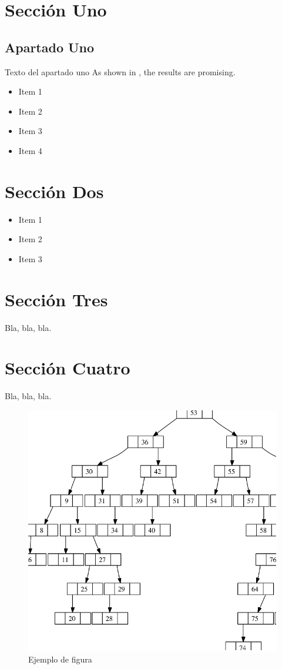 \section{Sección Uno}
\subsection{Apartado Uno}
\begin{large}
Texto del apartado uno
As shown in \cite{smith2023}, the results are promising.

\begin{itemize}
   \item Item 1
   \item Item 2
   \item Item 3
   \item Item 4
\end{itemize}
\end{large}

\section{Sección Dos}

\begin{large}
\begin{itemize}
   \item Item 1
   \item Item 2
   \item Item 3
\end{itemize}
\end{large}

\section{Sección Tres}

\begin{large}
Bla, bla, bla.
\end{large}

\section{Sección Cuatro}

\begin{large}
Bla, bla, bla.
\end{large}

\newpage

\begin{figure}[htb]
   \centering
   \includegraphics[width=0.8\linewidth]{images/figura_1}
   \caption{Ejemplo de figura}
   \label{chapter:intro}
\end{figure}